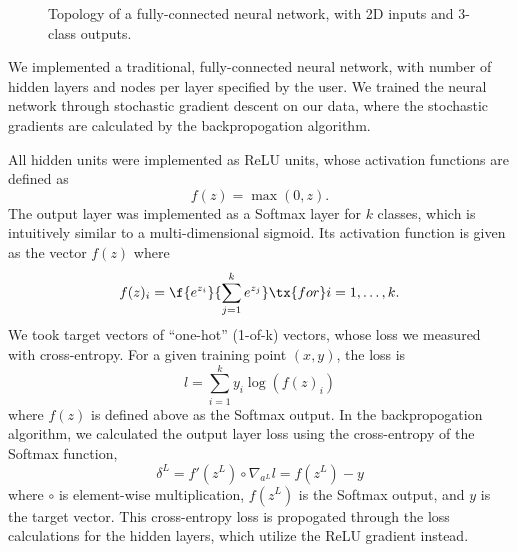 \documentclass{article}
\begin{document}
\begin{multicols}{2}
\begin{figure}[t]
    \caption{Topology of a fully-connected neural network, with 2D inputs and 3-class outputs.}
\end{figure}

We implemented a traditional, fully-connected neural network, with
number of hidden layers and nodes per layer specified by the user.
We trained the neural network through stochastic gradient descent on
our data, where the stochastic gradients are calculated by the
backpropogation algorithm.

All hidden units were implemented as ReLU units, whose activation functions
are defined as
\begin{equation}f(z) = \max(0, z).\end{equation}
The output layer was implemented as a Softmax layer for $k$ classes,
which is intuitively similar to a multi-dimensional sigmoid. Its activation function
is given as the vector $f(z)$ where
\begin{equation}
f(z)_i = \f{e^{z_i}}{\sum_{j=1}^{k}{e^{z_j}}} \tx{ for } i = 1,\dots,k.
\end{equation}
We took target vectors of ``one-hot'' (1-of-k) vectors, whose loss we measured
with cross-entropy. For a given training point $(x,y)$, the loss is
\begin{equation}
l = \sum_{i = 1}^k{y_i \log(f(z)_i)}
\end{equation}
where $f(z)$ is defined above as the Softmax output.
In the backpropogation algorithm, we calculated the output layer loss using the
cross-entropy of the Softmax function,
\begin{equation}\delta^L = f'(z^L)\circ\nabla_{a^L}l = f(z^L) - y\end{equation}
where $\circ$ is element-wise multiplication, $f(z^L)$ is the Softmax output,
and $y$ is the target vector. This cross-entropy loss is propogated through the 
loss calculations for the hidden layers, which utilize the ReLU gradient instead.


\end{multicols}
\end{document}
